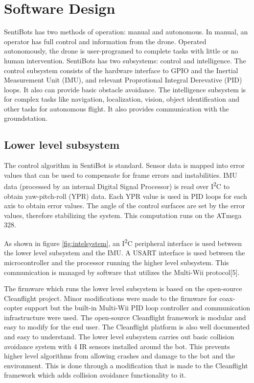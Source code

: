 \documentclass[12pt]{article}
\begin{document}
\section{Software Design}

SentiBots has two methods of operation: manual and autonomous. In manual, an operator has full control and information from the drone. Operated autonomously, the drone is user-programed to complete tasks with little or no human intervention. SentiBots has two subsystems: control and intelligence. The control subsystem consists of the hardware interface to GPIO and the Inertial Measurement Unit (IMU), and relevant Proprotional Integral Derevative (PID) loops. It also can provide basic obstacle avoidance. The intelligence subsystem is for complex tasks like navigation, localization, vision, object identification and other tasks for autonomous flight. It also provides communication with the groundstation.

\subsection{Lower level subsystem}

The control algorithm in SentiBot is standard. Sensor data is mapped into error values that can be used to compensate for frame errors and instabilities. IMU data (processed by an internal Digital Signal Processor) is read over I\textsuperscript{2}C to obtain yaw-pitch-roll (YPR) data. Each YPR value is used in PID loops for each axis to obtain error values. The angle of the control surfaces are set by the error values, therefore stabilizing the system. This computation runs on the ATmega 328.

As shown in figure \ref{fig:intelsystem}, an I\textsuperscript{2}C peripheral interface is used between the lower level subsystem and the IMU. A USART interface is used between the microcontroller and the processor running the higher level subsystem. This communication is managed by software that utilizes the Multi-Wii protocol[5].

The firmware which runs the lower level subsystem is based on the open-source Cleanflight project. Minor modifications were made to the firmware for coax-copter support but the built-in Multi-Wii PID loop controller and communication infrastructure were used. The open-source Cleanflight framework is modular and easy to modify for the end user. The Cleanflight platform is also well documented and easy to understand. The lower level subsystem carries out basic collision avoidance system with 4 IR sensors installed around the bot. This prevents higher level algorithms from allowing crashes and damage to the bot and the environment. This is done through a modification that is made to the Cleanflight framework which adds collision avoidance functionality to it.
\end{document}
